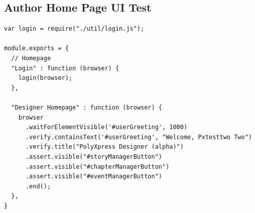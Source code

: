 \documentclass[12pt]{ucthesis}
\begin{document}
\subsection{Author Home Page UI Test}
\begin{lstlisting}
var login = require("./util/login.js");

module.exports = {
  // Homepage
  "Login" : function (browser) {
    login(browser);
  },

  "Designer Homepage" : function (browser) {
    browser
      .waitForElementVisible('#userGreeting', 1000)
      .verify.containsText('#userGreeting', "Welcome, Pxtesttwo Two")
      .verify.title("PolyXpress Designer (alpha)")
      .assert.visible("#storyManagerButton")
      .assert.visible("#chapterManagerButton")
      .assert.visible("#eventManagerButton")
      .end();
  },
}
\end{lstlisting}
\end{document}
